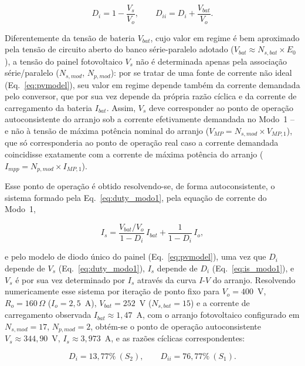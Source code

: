 \begin{equation}
D_i = 1-\frac{V_s}{V_o}, \qquad D_{ii} = D_i+\frac{V_{bat}}{V_o}.
\label{eq:duty_modo1}
\end{equation}

Diferentemente da tensão de bateria $V_{bat}$, cujo valor em regime é bem
aproximado pela tensão de circuito aberto do banco série-paralelo adotado
($V_{bat}\approx N_{s,bat}\times E_0$), a tensão do painel fotovoltaico
$V_s$ não é determinada apenas pela associação série/paralelo
($N_{s,mod}$, $N_{p,mod}$): por se tratar de uma fonte de corrente não
ideal (Eq.~\eqref{eq:pvmodel}), seu valor em regime depende também da
corrente demandada pelo conversor, que por sua vez depende da própria
razão cíclica e da corrente de carregamento da bateria $I_{bat}$. Assim,
$V_s$ deve corresponder ao ponto de operação autoconsistente do arranjo
sob a corrente efetivamente demandada no Modo~1 -- e não à tensão de
máxima potência nominal do arranjo
($V_{MP}=N_{s,mod}\times V_{MP,1}$), que só corresponderia ao ponto de
operação real caso a corrente demandada coincidisse exatamente com a
corrente de máxima potência do arranjo ($I_{mpp}=N_{p,mod}\times I_{MP,1}$).

Esse ponto de operação é obtido resolvendo-se, de forma autoconsistente,
o sistema formado pela Eq.~\eqref{eq:duty_modo1}, pela equação de corrente
do Modo~1,

\begin{equation}
I_s = \frac{V_{bat}/V_o}{1-D_i}\,I_{bat} + \frac{1}{1-D_i}\,I_o,
\label{eq:is_modo1}
\end{equation}

e pelo modelo de diodo único do painel (Eq.~\eqref{eq:pvmodel}), uma vez
que $D_i$ depende de $V_s$ (Eq.~\eqref{eq:duty_modo1}), $I_s$ depende de
$D_i$ (Eq.~\eqref{eq:is_modo1}), e $V_s$ é por sua vez determinado por
$I_s$ através da curva $I$-$V$ do arranjo. Resolvendo numericamente esse
sistema por iteração de ponto fixo para $V_o=400$~V, $R_o=160\,\Omega$
($I_o=2{,}5$~A), $V_{bat}=252$~V ($N_{s,bat}=15$) e a corrente de
carregamento observada $I_{bat}\approx1{,}47$~A, com o arranjo
fotovoltaico configurado em $N_{s,mod}=17$, $N_{p,mod}=2$, obtém-se o
ponto de operação autoconsistente $V_s\approx344{,}90$~V,
$I_s\approx3{,}973$~A, e as razões cíclicas correspondentes:

\begin{equation}
D_i = 13{,}77\%\ (S_2), \qquad D_{ii} = 76{,}77\%\ (S_1).
\label{eq:duty_valores}
\end{equation}

